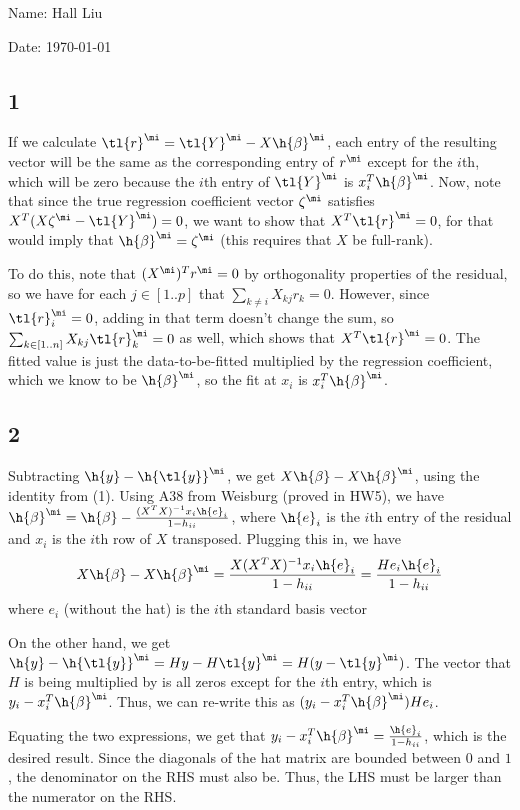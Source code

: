 \documentclass{article}
\begin{document}
Name: Hall Liu

Date: \today 
\vspace{1.5cm}
\subsection*{1}
If we calculate $\tl{r}^\mi=\tl{Y}^\mi-X\h{\beta}^\mi$, each entry of the resulting vector will be the same as the corresponding entry of $r^\mi$ except for the $i$th, which will be zero because the $i$th entry of $\tl{Y}^\mi$ is $x_i^T\h{\beta}^\mi$. Now, note that since the true regression coefficient vector $\zeta^\mi$ satisfies $X^T(X\zeta^\mi-\tl{Y}^\mi)=0$, we want to show that $X^T\tl{r}^\mi=0$, for that would imply that $\h{\beta}^\mi=\zeta^\mi$ (this requires that $X$ be full-rank). 

To do this, note that $(X^\mi)^Tr^\mi=0$ by orthogonality properties of the residual, so we have for each $j\in[1..p]$ that $\sum_{k\neq i}X_{kj}r_k=0$. However, since $\tl{r}^\mi_i=0$, adding in that term doesn't change the sum, so $\sum_{k\in[1..n]}X_{kj}\tl{r}^\mi_k=0$ as well, which shows that $X^T\tl{r}^\mi=0$.
The fitted value is just the data-to-be-fitted multiplied by the regression coefficient, which we know to be $\h{\beta}^\mi$, so the fit at $x_i$ is $x_i^T\h{\beta}^\mi$.
\subsection*{2}
Subtracting $\h{y}-\h{\tl{y}}^\mi$, we get $X\h{\beta}-X\h{\beta}^\mi$, using the identity from (1). Using A38 from Weisburg (proved in HW5), we have $\h{\beta}^\mi=\h{\beta}-\frac{(X^TX)^{-1}x_i\h{e}_i}{1-h_{ii}}$, where $\h{e}_i$ is the $i$th entry of the residual and $x_i$ is the $i$th row of $X$ transposed. Plugging this in, we have 
\[X\h{\beta}-X\h{\beta}^\mi=\frac{X(X^TX)^{-1}x_i\h{e}_i}{1-h_{ii}}=\frac{He_i\h{e}_i}{1-h_{ii}}\]
where $e_i$ (without the hat) is the $i$th standard basis vector

On the other hand, we get $\h{y}-\h{\tl{y}}^\mi=Hy-H\tl{y}^\mi=H(y-\tl{y}^\mi)$. The vector that $H$ is being multiplied by is all zeros except for the $i$th entry, which is $y_i-x_i^T\h{\beta}^\mi$. Thus, we can re-write this as $(y_i-x_i^T\h{\beta}^\mi)He_i$.

Equating the two expressions, we get that $y_i-x_i^T\h{\beta}^\mi=\frac{\h{e}_i}{1-h_{ii}}$, which is the desired result.
Since the diagonals of the hat matrix are bounded between $0$ and $1$, the denominator on the RHS must also be. Thus, the LHS must be larger than the numerator on the RHS.
\end{document}
